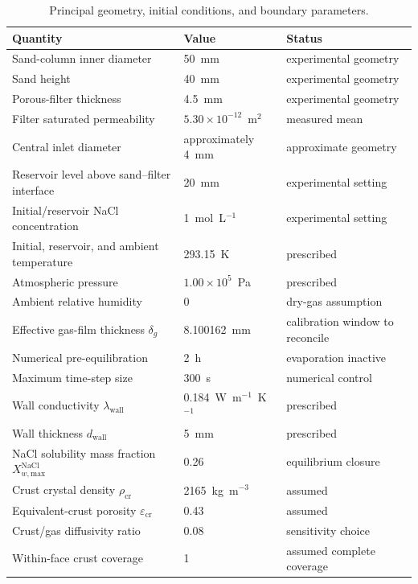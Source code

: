 \documentclass[draft,wrr]{agutexSI2019}
\begin{document}
\begin{table}
\caption{Principal geometry, initial conditions, and boundary parameters.}
\label{tab:si-domain}
\centering
\begin{tabular}{p{}p{}p{}}
\toprule
Quantity & Value & Status \\
\midrule
Sand-column inner diameter & 50~mm & experimental geometry \\
Sand height & 40~mm & experimental geometry \\
Porous-filter thickness & 4.5~mm & experimental geometry \\
Filter saturated permeability & $5.30\times10^{-12}$~m$^2$ & measured mean \\
Central inlet diameter & approximately 4~mm & approximate geometry \\
Reservoir level above sand--filter interface & 20~mm & experimental setting \\
Initial/reservoir NaCl concentration & 1~mol~L$^{-1}$ & experimental setting \\
Initial, reservoir, and ambient temperature & 293.15~K & prescribed \\
Atmospheric pressure & $1.00\times10^5$~Pa & prescribed \\
Ambient relative humidity & 0 & dry-gas assumption \\
Effective gas-film thickness $\delta_g$ & 8.100162~mm & calibration window to reconcile \\
Numerical pre-equilibration & 2~h & evaporation inactive \\
Maximum time-step size & 300~s & numerical control \\
Wall conductivity $\lambda_{\mathrm{wall}}$ & 0.184~W~m$^{-1}$~K$^{-1}$ & prescribed \\
Wall thickness $d_{\mathrm{wall}}$ & 5~mm & prescribed \\
NaCl solubility mass fraction $X_{w,\mathrm{max}}^{\mathrm{NaCl}}$ & 0.26 & equilibrium closure \\
Crust crystal density $\rho_{\mathrm{cr}}$ & 2165~kg~m$^{-3}$ & assumed \\
Equivalent-crust porosity $\varepsilon_{\mathrm{cr}}$ & 0.43 & assumed \\
Crust/gas diffusivity ratio & 0.08 & sensitivity choice \\
Within-face crust coverage & 1 & assumed complete coverage \\
\bottomrule
\end{tabular}
\end{table}
\end{document}
